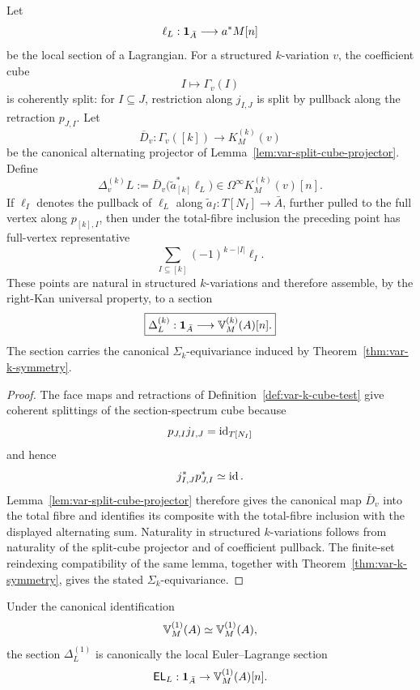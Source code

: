\begin{construction}
\label{con:var-k-variation-lagrangian}
Let
\[
    \ell_L:\mathbf 1_{\bar A}\longrightarrow a^*M[n]
\]
be the local section of a Lagrangian. For a structured \(k\)-variation \(v\), the coefficient cube
\[
    I\longmapsto\Gamma_v(I)
\]
is coherently split: for \(I\subseteq J\), restriction along \(j_{I,J}\) is split by pullback along the retraction \(p_{J,I}\). Let
\[
    \overline D_v:
    \Gamma_v([k])
    \longrightarrow
    K_M^{(k)}(v)
\]
be the canonical alternating projector of Lemma~\ref{lem:var-split-cube-projector}. Define
\[
    \boxed{
    \Delta_v^{(k)}L
    :=
    \overline D_v\bigl(\widetilde a_{[k]}^*\ell_L\bigr)
    \in
    \Omega^\infty K_M^{(k)}(v)[n].
    }
\]
If \(\ell_I\) denotes the pullback of \(\ell_L\) along \(\widetilde a_I:T[N_I]\to\bar A\), further pulled to the full vertex along \(p_{[k],I}\), then under the total-fibre inclusion the preceding point has full-vertex representative
\[
    \boxed{
    \sum_{I\subseteq[k]}
    (-1)^{k-|I|}\ell_I.
    }
\]
These points are natural in structured \(k\)-variations and therefore assemble, by the right-Kan universal property, to a section
\[
    \boxed{
    \Delta_L^{(k)}:
    \mathbf 1_{\bar A}
    \longrightarrow
    \mathbb V_M^{(k)}(A)[n].
    }
\]
The section carries the canonical \(\Sigma_k\)-equivariance induced by Theorem~\ref{thm:var-k-symmetry}.
\end{construction}

\begin{proof}
The face maps and retractions of Definition~\ref{def:var-k-cube-test} give coherent splittings of the section-spectrum cube because
\[
    p_{J,I}j_{I,J}=\operatorname{id}_{T[N_I]}
\]
and hence
\[
    j_{I,J}^*p_{J,I}^*\simeq\operatorname{id}.
\]
Lemma~\ref{lem:var-split-cube-projector} therefore gives the canonical map \(\overline D_v\) into the total fibre and identifies its composite with the total-fibre inclusion with the displayed alternating sum. Naturality in structured \(k\)-variations follows from naturality of the split-cube projector and of coefficient pullback. The finite-set reindexing compatibility of the same lemma, together with Theorem~\ref{thm:var-k-symmetry}, gives the stated \(\Sigma_k\)-equivariance.
\end{proof}

\begin{proposition}
\label{prop:var-k1-euler}
Under the canonical identification
\[
    \mathbb V_M^{(1)}(A)\simeq\mathbb V^{(1)}_M(A),
\]
the section \(\Delta_L^{(1)}\) is canonically the local Euler--Lagrange section
\[
    \mathsf{EL}_L:\mathbf 1_{\bar A}\to\mathbb V^{(1)}_M(A)[n].
\]
\end{proposition}

